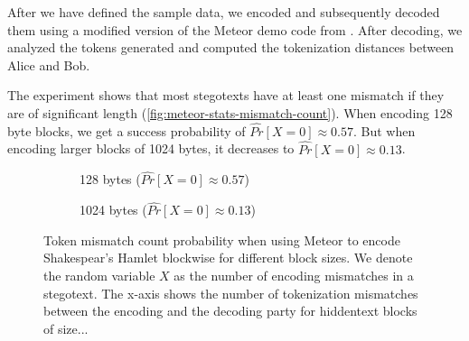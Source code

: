 After we have defined the sample data, we encoded and subsequently decoded them using a modified version of the Meteor demo code from \cite{MeteorDemo2021}.
After decoding, we analyzed the tokens generated and computed the tokenization distances between Alice and Bob.

The experiment shows that most stegotexts have at least one mismatch if they are of significant length (\autoref{fig:meteor-stats-mismatch-count}).
When encoding 128 byte blocks, we get a success probability of $\hat{Pr}[X=0] \approx 0.57$.
But when encoding larger blocks of 1024 bytes, it decreases to $\hat{Pr}[X=0] \approx 0.13$.

\begin{figure}[htbp]%
  \begin{subfigure}{.5\textwidth}%
    \centering%
      \resizebox{0.9\linewidth}{!}{%
    }%
    \caption{128 bytes ($\hat{Pr}[X=0] \approx 0.57$)}%
  \end{subfigure}%
  \begin{subfigure}{.5\textwidth}%
    \centering%
      \resizebox{0.9\linewidth}{!}{%
    }%
    \caption{1024 bytes ($\hat{Pr}[X=0] \approx 0.13$)}%
  \end{subfigure}%
  \caption{
  Token mismatch count probability when using Meteor to encode Shakespear's Hamlet blockwise for different block sizes.
  We denote the random variable $X$ as the number of encoding mismatches in a stegotext.
  The x-axis shows the number of tokenization mismatches between the encoding and the decoding party for hiddentext blocks of size...}
  \label{fig:meteor-stats-mismatch-count} 
\end{figure}


